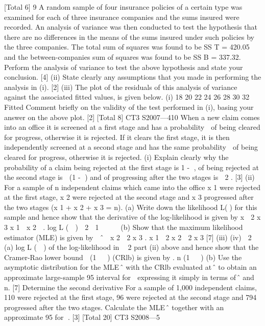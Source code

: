 [Total 6]
9
A random sample of four insurance policies of a certain type was examined for each
of three insurance companies and the sums insured were recorded. An analysis of
variance was then conducted to test the hypothesis that there are no differences in the
means of the sums insured under such policies by the three companies.
The total sum of squares was found to be SS T = 420.05 and the between-companies
sum of squares was found to be SS B = 337.32.
Perform the analysis of variance to test the above hypothesis and state your
conclusion.
[4]
(ii) State clearly any assumptions that you made in performing the analysis in (i).
[2]
(iii) The plot of the residuals of this analysis of variance against the associated
fitted values, is given below.
(i)
18
20
22
24
26
28
30
32
Fitted
Comment briefly on the validity of the test performed in (i), basing your
answer on the above plot.
[2]
[Total 8]
CT3 S2007—410
When a new claim comes into an office it is screened at a first stage and has a
probability  of being cleared for progress, otherwise it is rejected. If it clears the first
stage, it is then independently screened at a second stage and has the same probability
 of being cleared for progress, otherwise it is rejected.
(i) Explain clearly why the probability of a claim being rejected at the first stage
is 1 - , of being rejected at the second stage is  (1 - ) and of progressing
after the two stages is  2 .
[3]
(ii) For a sample of n independent claims which came into the office x 1 were
rejected at the first stage, x 2 were rejected at the second stage and x 3
progressed after the two stages (x 1 + x 2 + x 3 = n).
(a)
Write down the likelihood L() for this sample and hence show that the
derivative of the log-likelihood is given by
x  2 x 3 x 1  x 2

.
log L (  )  2

1  


(b)
Show that the maximum likelihood estimator (MLE) is given by
 ˆ 
x 2  2 x 3
.
x 1  2 x 2  2 x 3
[7]
(iii)
(iv)

2
(a) log L (  ) of the log-likelihood in
 2
part (ii) above and hence show that the Cramer-Rao lower bound
 (1   )
(CRlb) is given by
.
n (1   )
(b) Use the asymptotic distribution for the MLE ̂ with the CRlb
evaluated at ̂ to obtain an approximate large-sample 95%
interval for  expressing it simply in terms of ̂ and n.
[7]
Determine the second derivative
For a sample of 1,000 independent claims, 110 were rejected at the first stage,
96 were rejected at the second stage and 794 progressed after the two stages.
Calculate the MLE ̂ together with an approximate 95%
for .
[3]
[Total 20]
CT3 S2008—5

